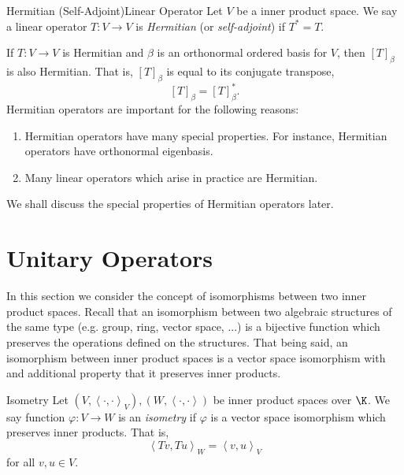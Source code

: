 \documentclass[linearalgebra]{subfiles}
\begin{document}
    \begin{definition}{Hermitian (Self-Adjoint)}{Linear Operator}
        Let $V$ be a inner product space. We say a linear operator $T:V\to V$ is \emph{Hermitian} (or \emph{self-adjoint}) if $T^* = T$.
    \end{definition}

    \noindent If $T:V\to V$ is Hermitian and $\beta$ is an orthonormal ordered basis for $V$, then $\left[ T \right] _\beta$ is also Hermitian. That is, $\left[ T \right] _\beta$ is equal to its conjugate transpose,
    \begin{equation*}
        \left[ T \right] _\beta = \left[ T \right] _\beta^*.
    \end{equation*}
    Hermitian operators are important for the following reasons:
    \begin{enumerate}
        \item Hermitian operators have many special properties. For instance, Hermitian operators have orthonormal eigenbasis.
        \item Many linear operators which arise in practice are Hermitian.
    \end{enumerate}
    We shall discuss the special properties of Hermitian operators later.

    \section{Unitary Operators}
    
    \begin{remark}
        In this section we consider the concept of isomorphisms between two inner product spaces. Recall that an isomorphism between two algebraic structures of the same type (e.g. group, ring, vector space, ...) is a bijective function which preserves the operations defined on the structures. That being said, an isomorphism between inner product spaces is a vector space isomorphism with and additional property that it preserves inner products.
    \end{remark}

    \begin{definition}{Isometry}{}
        Let $\left( V, \left\langle \cdot, \cdot\right\rangle _V \right), \left( W,\left\langle \cdot, \cdot\right\rangle  \right)$ be inner product spaces over $\K$. We say function $\varphi:V\to W$ is an \emph{isometry} if $\varphi$ is a vector space isomorphism which preserves inner products. That is,
        \begin{equation*}
            \left\langle Tv, Tu\right\rangle _W = \left\langle v, u\right\rangle _V
        \end{equation*}
        for all $v,u\in V$.
    \end{definition}
\end{document}
